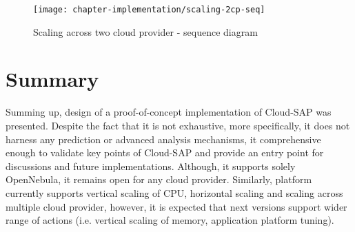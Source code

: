 \begin{figure}[!ht]
  \begin{center}
    \texttt{[image: chapter-implementation/scaling-2cp-seq]}
  \end{center}
  \caption{Scaling across two cloud provider - sequence diagram}
  \label{fig:scaling-2cp-seq}
\end{figure}

\newpage
\section{Summary}
Summing up, design of a proof-of-concept implementation of Cloud-SAP was presented. Despite the fact that it is not exhaustive, more specifically, it does not harness any prediction or advanced analysis mechanisms, it comprehensive enough to validate key points of Cloud-SAP and provide an entry point for discussions and future implementations. Although, it supports solely OpenNebula, it remains open for any cloud provider. Similarly, platform currently supports vertical scaling of CPU, horizontal scaling and scaling across multiple cloud provider, however, it is expected that next versions support wider range of actions (i.e. vertical scaling of memory, application platform tuning).



